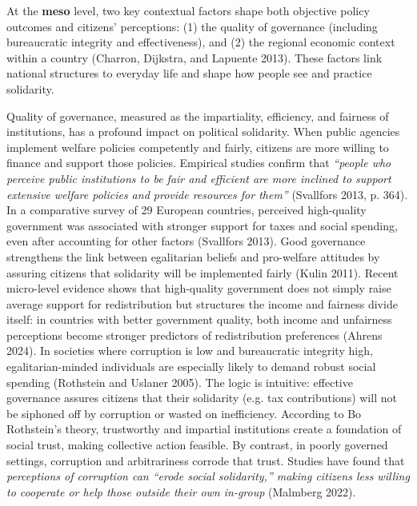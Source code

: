 \documentclass[12pt]{article}
\begin{document}
At the \textbf{meso} level, two key contextual factors shape both
objective policy outcomes and citizens' perceptions: (1) the quality of
governance (including bureaucratic integrity and effectiveness), and (2)
the regional economic context within a country (Charron, Dijkstra, and
Lapuente 2013). These factors link national structures to everyday life
and shape how people see and practice solidarity.

Quality of governance, measured as the impartiality, efficiency, and
fairness of institutions, has a profound impact on political solidarity.
When public agencies implement welfare policies competently and fairly,
citizens are more willing to finance and support those policies.
Empirical studies confirm that \emph{``people who perceive public
institutions to be fair and efficient are more inclined to support
extensive welfare policies and provide resources for them''} (Svallfors
2013, p. 364). In a comparative survey of 29 European countries,
perceived high-quality government was associated with stronger support
for taxes and social spending, even after accounting for other factors
(Svallfors 2013). Good governance strengthens the link between
egalitarian beliefs and pro-welfare attitudes by assuring citizens that
solidarity will be implemented fairly (Kulin 2011). Recent micro-level
evidence shows that high-quality government does not simply raise
average support for redistribution but structures the income and
fairness divide itself: in countries with better government quality,
both income and unfairness perceptions become stronger predictors of
redistribution preferences (Ahrens 2024). In societies where corruption
is low and bureaucratic integrity high, egalitarian-minded individuals
are especially likely to demand robust social spending (Rothstein and
Uslaner 2005). The logic is intuitive: effective governance assures
citizens that their solidarity (e.g. tax contributions) will not be
siphoned off by corruption or wasted on inefficiency. According to Bo
Rothstein's theory, trustworthy and impartial institutions create a
foundation of social trust, making collective action feasible. By
contrast, in poorly governed settings, corruption and arbitrariness
corrode that trust. Studies have found that \emph{perceptions of
corruption can ``erode social solidarity,'' making citizens less willing
to cooperate or help those outside their own in-group} (Malmberg 2022).
\end{document}

